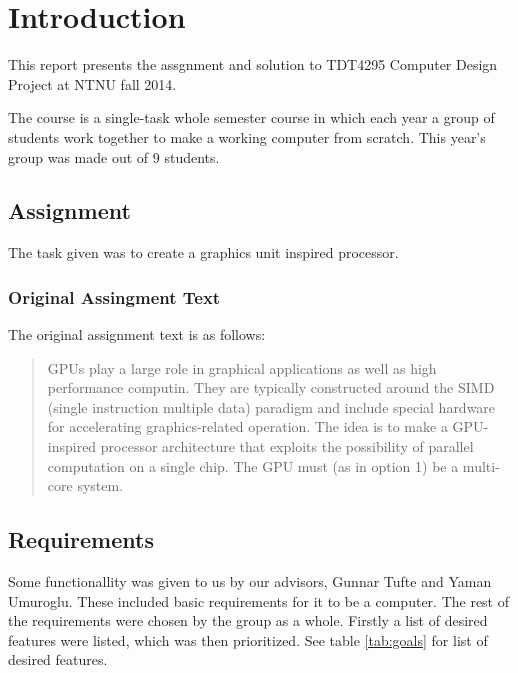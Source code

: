 \section{Introduction}
\label{sec:intro}

This report presents the assgnment and solution to TDT4295 Computer Design Project at NTNU fall 2014.

The course is a single-task whole semester course in which each year a group of students
work together to make a working computer from scratch.
This year's group was made out of 9 students.

\subsection{Assignment}
The task given was to create a graphics unit inspired processor.

\subsubsection{Original Assingment Text}

The original assignment text is as follows:

\begin{quotation}
    GPUs play a large role in graphical applications as well as high performance computin. They
    are typically constructed around the SIMD (single instruction multiple data) paradigm and
    include special hardware for accelerating graphics-related operation. The idea is to make a
    GPU-inspired processor architecture that exploits the possibility of parallel computation on a
    single chip. The GPU must (as in option 1) be a multi-core system.
\end{quotation}

\subsection{Requirements}

Some functionallity was given to us by our advisors, Gunnar Tufte and Yaman Umuroglu.
These included basic requirements for it to be a computer.
The rest of the requirements were chosen by the group as a whole.
Firstly a list of desired features were listed, which was then prioritized.
See table \ref{tab:goals} for list of desired features.

